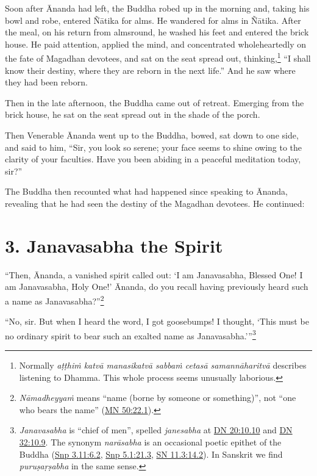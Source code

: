 \documentclass[12pt,openany]{book}%
\begin{document}
Soon after Ānanda had left, the Buddha robed up in the morning and, taking his bowl and robe, entered \textsanskrit{Ñātika} for alms. He wandered for alms in \textsanskrit{Ñātika}. After the meal, on his return from almsround, he washed his feet and entered the brick house. He paid attention, applied the mind, and concentrated wholeheartedly on the fate of Magadhan devotees, and sat on the seat spread out, thinking,\footnote{Normally \textit{\textsanskrit{aṭṭhiṁ} \textsanskrit{katvā} \textsanskrit{manasikatvā} \textsanskrit{sabbaṁ} \textsanskrit{cetasā} \textsanskrit{samannāharitvā}} describes listening to Dhamma. This whole process seems unusually laborious. } “I shall know their destiny, where they are reborn in the next life.” And he saw where they had been reborn. 

Then in the late afternoon, the Buddha came out of retreat. Emerging from the brick house, he sat on the seat spread out in the shade of the porch. 

Then Venerable Ānanda went up to the Buddha, bowed, sat down to one side, and said to him, “Sir, you look so serene; your face seems to shine owing to the clarity of your faculties. Have you been abiding in a peaceful meditation today, sir?” 

The Buddha then recounted what had happened since speaking to Ānanda, revealing that he had seen the destiny of the Magadhan devotees. He continued: 

\section*{3. Janavasabha the Spirit }

“Then, Ānanda, a vanished spirit called out: ‘I am Janavasabha, Blessed One! I am Janavasabha, Holy One!’ Ānanda, do you recall having previously heard such a name as Janavasabha?”\footnote{\textit{\textsanskrit{Nāmadheyyaṁ}} means “name (borne by someone or something)”, not “one who bears the name” (\href{https://suttacentral.net/mn50/en/sujato\#22.1}{MN 50:22.1}). } 

“No, sir. But when I heard the word, I got goosebumps! I thought, ‘This must be no ordinary spirit to bear such an exalted name as Janavasabha.’”\footnote{\textit{Janavasabha} is “chief of men”, spelled \textit{janesabha} at \href{https://suttacentral.net/dn20/en/sujato\#10.10}{DN 20:10.10} and \href{https://suttacentral.net/dn32/en/sujato\#10.9}{DN 32:10.9}. The synonym \textit{\textsanskrit{narāsabha}} is an occasional poetic epithet of the Buddha (\href{https://suttacentral.net/snp3.11/en/sujato\#6.2}{Snp 3.11:6.2}, \href{https://suttacentral.net/snp5.1/en/sujato\#21.3}{Snp 5.1:21.3}, \href{https://suttacentral.net/sn11.3/en/sujato\#14.2}{SN 11.3:14.2}). In Sanskrit we find \textit{\textsanskrit{puruṣaṛṣabha}} in the same sense. } 
\end{document}
